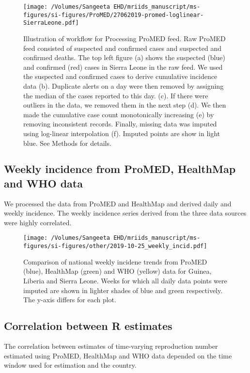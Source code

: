 \documentclass[9pt,twoside,lineno]{pnas-new}
\begin{document}
\begin{figure}
  \centering
  \texttt{[image: /Volumes/Sangeeta EHD/mriids\_manuscript/ms-figures/si-figures/ProMED/27062019-promed-loglinear-SierraLeone.pdf]}
  \caption{Illustration of workflow for Processing ProMED feed.
    Raw ProMED feed consisted of suspected and confirmed
    cases and suspected and confirmed
    deaths. The top left figure (a) shows the suspected (blue) and
    confirmed (red) cases in Sierra Leone in the raw feed.
    We used the suspected and confirmed cases to derive cumulative
    incidence data (b). Duplicate alerts on a day were then removed
    by assigning the median of the cases reported to this day.
    (c).
    If there were outliers in the data, we removed them in the next step (d).
    We then made the cumulative case count monotonically increasing (e) by
    removing inconsistent records. Finally, missing data was imputed using
    log-linear interpolation (f). Imputed points are show in light blue.
    See Methods for details.}
\label{fig:dataclean}
\end{figure}

\subsection{Weekly incidence from ProMED, HealthMap and WHO data}

We processed the data from ProMED and HealthMap and derived daily and
weekly incidence. The weekly incidence series derived from the three
data sources were highly correlated.

\begin{figure}
  \centering
  \texttt{[image: /Volumes/Sangeeta EHD/mriids\_manuscript/ms-figures/si-figures/other/2019-10-25\_weekly\_incid.pdf]}
  \caption{Comparison of national weekly incidene trends from ProMED (blue),
    HealthMap (green) and WHO (yellow) data for Guinea, Liberia and
    Sierra Leone. Weeks for which all daily data points were imputed
    are shown in lighter shades of blue and green respectively. The
y-axis differs for each plot.}
\label{fig:weekly}
\end{figure}


\subsection{Correlation between R estimates}\label{correlation-between-r-estimates}

The correlation between estimates of time-varying reproduction number 
estimated using ProMED, HealthMap and WHO data depended on the
time window used for estimation and the country.
\end{document}
